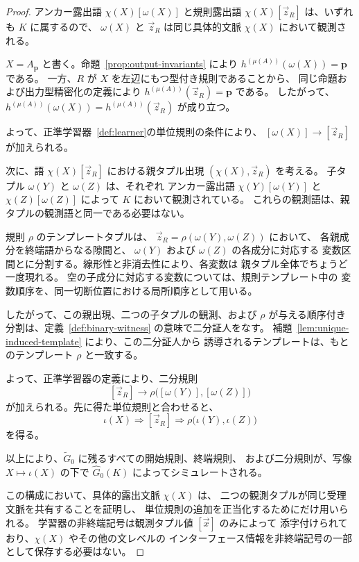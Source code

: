 \documentclass[11pt,a4paper]{ltjsarticle}
\theoremstyle{remark}
\newcommand{\tuple}[1]{\vec{#1}}
\begin{document}
\begin{proof}
アンカー露出語 \(\chi(X)[\omega(X)]\) と規則露出語
\(\chi(X)[\tuple z_R]\) は、いずれも \(K\) に属するので、
\(\omega(X)\) と \(\tuple z_R\) は同じ具体的文脈
\(\chi(X)\) において観測される。

\(X=A_{\mathbf p}\) と書く。命題~\ref{prop:output-invariants} により
\(h^{(\mu(A))}(\omega(X))=\mathbf p\) である。
一方、\(R\) が \(X\) を左辺にもつ型付き規則であることから、
同じ命題および出力型精密化の定義により
\(h^{(\mu(A))}(\tuple z_R)=\mathbf p\) である。
したがって、
\(h^{(\mu(A))}(\omega(X))
 =h^{(\mu(A))}(\tuple z_R)\)
が成り立つ。

よって、正準学習器~\ref{def:learner}の単位規則の条件により、
\([\omega(X)]\to[\tuple z_R]\) が加えられる。

次に、語 \(\chi(X)[\tuple z_R]\) における親タプル出現
\((\chi(X),\tuple z_R)\) を考える。
子タプル \(\omega(Y)\) と \(\omega(Z)\) は、それぞれ
アンカー露出語 \(\chi(Y)[\omega(Y)]\) と
\(\chi(Z)[\omega(Z)]\) によって \(K\) において観測されている。
これらの観測語は、親タプルの観測語と同一である必要はない。

規則 \(\rho\) のテンプレートタプルは、
\(\tuple z_R=\rho(\omega(Y),\omega(Z))\) において、
各親成分を終端語からなる隙間と、
\(\omega(Y)\) および \(\omega(Z)\) の各成分に対応する
変数区間とに分割する。線形性と非消去性により、各変数は
親タプル全体でちょうど一度現れる。
空の子成分に対応する変数については、規則テンプレート中の
変数順序を、同一切断位置における局所順序として用いる。

したがって、この親出現、二つの子タプルの観測、および
\(\rho\) が与える順序付き分割は、定義~\ref{def:binary-witness}
の意味で二分証人をなす。
補題~\ref{lem:unique-induced-template} により、この二分証人から
誘導されるテンプレートは、もとのテンプレート \(\rho\) と一致する。

よって、正準学習器の定義により、二分規則
\[
  [\tuple z_R]
  \to
  \rho\bigl([\omega(Y)],[\omega(Z)]\bigr)
\]
が加えられる。先に得た単位規則と合わせると、
\[
  \iota(X)
  \Rightarrow
  [\tuple z_R]
  \Rightarrow
  \rho\bigl(\iota(Y),\iota(Z)\bigr)
\]
を得る。

以上により、\(\widetilde G_0\) に残るすべての開始規則、終端規則、
および二分規則が、写像 \(X\mapsto\iota(X)\) の下で
\(\widehat G_0(K)\) によってシミュレートされる。

この構成において、具体的露出文脈 \(\chi(X)\) は、
二つの観測タプルが同じ受理文脈を共有することを証明し、
単位規則の追加を正当化するためにだけ用いられる。
学習器の非終端記号は観測タプル値 \([\tuple x]\) のみによって
添字付けられており、\(\chi(X)\) やその他の文レベルの
インターフェース情報を非終端記号の一部として保存する必要はない。
\end{proof}
\end{document}
